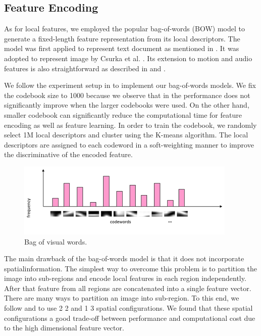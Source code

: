 \documentclass[review]{elsarticle}
\begin{document}
\subsection{Feature Encoding}
\label{feature_encoding}

As for local features, we employed the popular bag-of-words (BOW) model to generate a fixed-length feature representation from its local descriptors. The model was first applied to represent text document as mentioned in \cite{harris1954distributional}. It was adopted to represent image by Csurka et al. \cite{csurka2004visual}. Its extension to motion and audio features is also straightforward as described in \cite{sivic2009efficient} and \cite{jiang2010columbia}. 

We follow the experiment setup in \cite{jiang2010representations} to implement our bag-of-words models. We fix the codebook size to 1000 because we observe that in \cite{jiang2010representations} the performance does not significantly improve when the larger codebooks were used. On the other hand, smaller codebook can significantly reduce the computational time for feature encoding as well as feature learning. In order to train the codebook, we randomly select 1M local descriptors and cluster using the K-means algorithm. The local descriptors are assigned to each codeword in a soft-weighting manner \cite{jiang2007towards} to improve the discriminative of the encoded feature.
\begin{figure}[!h]
	\centering
	\includegraphics[width=0.7\linewidth]{Images/Bow.png}
	\caption{Bag of visual words.}
	\label{fig:bow}
\end{figure}

The main drawback of the bag-of-words model is that it does not incorporate spatialinformation. The simplest way to overcome this problem is to partition the image into sub-regions and encode local features in each region independently. After that feature from all regions are concatenated into a single feature vector. There are many ways to partition an image into sub-region. To this end, we follow \cite{jiang2010representations} and\cite{lazebnik2006beyond} to use 2  2 and 1  3 spatial configurations. We found that these spatial configurations a good trade-off between performance and computational cost due to the high dimensional feature vector.
\end{document}
